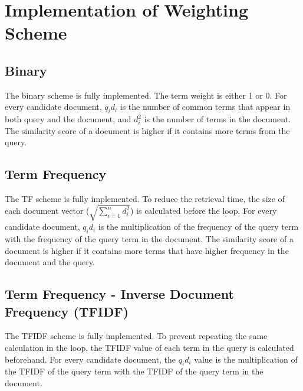 \documentclass[12pt, a4paper]{article}
\begin{document}
\section{Implementation of Weighting Scheme}
\subsection{Binary}
The binary scheme is fully implemented. The term weight is either 1 or 0. For every candidate
document, $q_i d_i$ is the number of common terms that appear in both query and the document, and
$d_i^2$ is the number of terms in the document. The similarity score of a document is higher if it
contains more terms from the query.

\subsection{Term Frequency}
The TF scheme is fully implemented. To reduce the retrieval time, the size of each document vector
($\sqrt{\sum\nolimits_{i=1}^n d_i^2}$) is calculated before the loop. For every candidate document,
$q_i d_i$ is the multiplication of the frequency of the query term with the frequency of the query
term in the document. The similarity score of a document is higher if it contains more terms that
have higher frequency in the document and the query.

\subsection{Term Frequency - Inverse Document Frequency (TFIDF)}
The TFIDF scheme is fully implemented. To prevent repeating the same calculation in the loop, the
TFIDF value of each term in the query is calculated beforehand. For every candidate document, the
$q_i d_i$ value is the multiplication of the TFIDF of the query term with the TFIDF of the query
term in the document.
\end{document}
